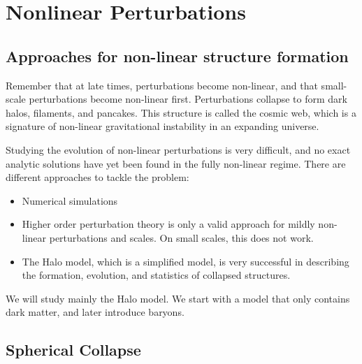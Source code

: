 \chapter{Nonlinear Perturbations}

\section{Approaches for non-linear structure formation}

Remember that at late times, perturbations become non-linear, and that small-scale perturbations become non-linear first.
Perturbations collapse to form dark halos, filaments, and pancakes.
This structure is called the cosmic web, which is a signature of non-linear gravitational instability in an expanding universe.

Studying the evolution of non-linear perturbations is very difficult, and no exact analytic solutions have yet been found in the fully non-linear regime.
There are different approaches to tackle the problem:
\begin{itemize}
	\item Numerical simulations
	\item Higher order perturbation theory is only a valid approach for mildly non-linear perturbations and scales.
	On small scales, this does not work.
	\item The Halo model, which is a simplified model, is very successful in describing the formation, evolution, and statistics of collapsed structures.
\end{itemize}

We will study mainly the Halo model. We start with a model that only contains dark matter, and later introduce baryons.

\section{Spherical Collapse}

